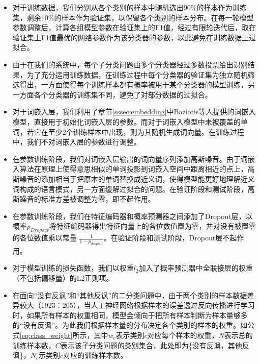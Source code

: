 \begin{itemize}

\item 对于训练数据，我们分别从各个类别的样本中随机选出90\%的样本作为训练集，剩余10\%的样本作为验证集，以保留各个类别的样本分布。在每一轮模型参数调整后，计算各组模型参数在验证集上的F1值，经过有限轮迭代后，取在验证集上F1值最优的网络参数作为该分类器的参数，以此避免在训练数据上过拟合。

\item 由于在我们的系统中，每个子分类问题由多个分类器经过多数投票给出识别结果，为了充分运用训练数据，在训练过程中每个分类器的验证集为独立随机筛选得出，一方面使得每个训练样本都有概率被用于某个分类器的模型训练，另一方面各个分类器的训练集不同，避免了对部分数据的过拟合。

\item 对于词嵌入层，我们利用了章节\ref{sssec:embedding}中Baziotis等人\cite{baziotis2018ntua}提供的词嵌入模型，直接用于初始化词嵌入层的参数。而对于词嵌入模型中未被覆盖的单词，若它在至少2个训练样本中出现，则为其随机生成词向量。在训练过程中，我们不对词嵌入层的参数进行调整。

\item 在参数训练阶段，我们对词嵌入层输出的词向量序列添加高斯噪音。由于词嵌入算法在原理上使得意思相似的单词投影到词嵌入空间中距离相近的点上，高斯噪音的添加相当于把原本的单词替换成近义词，使得模型能更好地理解近义词构成的语言模式，另一方面缓解过拟合的问题。在验证阶段和测试阶段，高斯躁音的标准方差被调整为零，即不起作用。

\item 在参数训练阶段，我们在特征编码器和概率预测器之间添加了Dropout层，以概率$p_{Dropout}$将特征编码器得出特征向量上的各位数值置为零，并对没有被置零的各位数值乘以常量 $\frac{1}{1-p_{dropout}}$。在验证阶段和测试阶段，Dropout层不起作用。

\item 对于模型训练的损失函数，我们以权重$l_2$加入了概率预测器中全联接层的权重（不包括偏移量）的L2正则项。

\item 在面向“没有反讽”和“其他反讽”的二分类问题中，由于两个类别的样本数据差异较大（1923：205），当人工神经网络根据样本的误差透过反向传播进行学习时，如果所有样本的权重相同，模型会倾向于把所有样本判断为样本量够多的“没有反讽”。为此我们根据样本量的分布决定各个类别的样本的权重。如公式\ref{eq:class_weight}所示，其中$w_c$表示类别$c$对应每个样本的权重，$N$表示总的训练样本数，$C$表示该子分类问题的类别集合，此处即为\{没有反讽，其他反讽\}，$N_c$示类别$c$对应的训练样本数。

\end{itemize}

